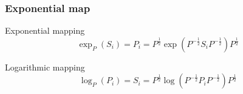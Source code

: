 \documentclass{beamer}
\begin{document}
\begin{frame}
\frametitle{Exponential map}
\begin{block}{Exponential mapping}
	\begin{equation*}
	 \exp_P(S_i)  = P_i = P^{\frac12} \exp(P^{-\frac12}S_iP^{-\frac12})P^{\frac12}
	\end{equation*}
\end{block}

\begin{block}{Logarithmic mapping}
	\begin{equation*}
	\log_P(P_i)  = S_i = P^{\frac12} \log(P^{-\frac12}P_iP^{-\frac12})P^{\frac12}
	\end{equation*}
\end{block}
\end{frame}

\end{document}
